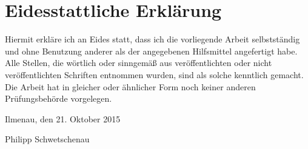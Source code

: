 \chapter*{Eidesstattliche Erklärung}

Hiermit erkläre ich an Eides statt, dass ich die vorliegende Arbeit selbstständig und ohne Benutzung anderer als der angegebenen Hilfsmittel angefertigt habe. Alle Stellen, die wörtlich oder sinngemäß aus veröffentlichten oder nicht veröffentlichten Schriften entnommen wurden, sind als solche kenntlich gemacht. Die Arbeit hat in gleicher oder ähnlicher Form noch keiner anderen Prüfungsbehörde vorgelegen.

\vspace{1.5cm}

\noindent Ilmenau, den 21. Oktober 2015

\vspace{1cm}

\begin{flushright}
\noindent Philipp Schwetschenau
\end{flushright}
